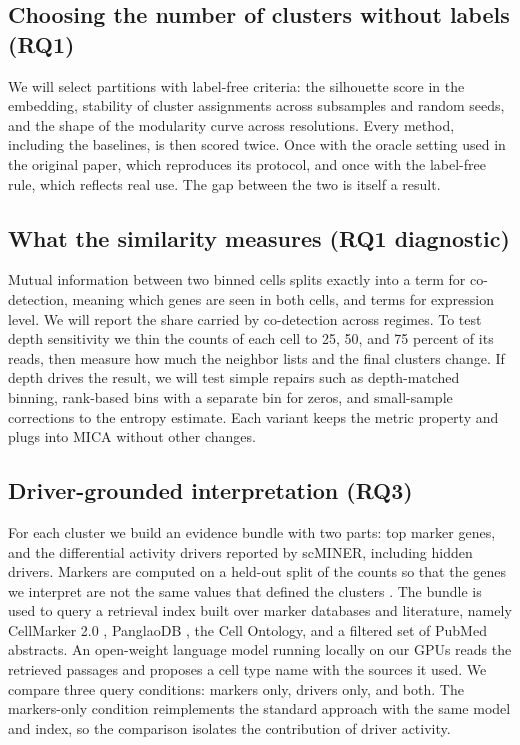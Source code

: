 \subsection{Choosing the number of clusters without labels (RQ1)}
We will select partitions with label-free criteria: the silhouette score in the embedding, stability of cluster assignments across subsamples and random seeds, and the shape of the modularity curve across resolutions. Every method, including the baselines, is then scored twice. Once with the oracle setting used in the original paper, which reproduces its protocol, and once with the label-free rule, which reflects real use. The gap between the two is itself a result.

\subsection{What the similarity measures (RQ1 diagnostic)}
Mutual information between two binned cells splits exactly into a term for co-detection, meaning which genes are seen in both cells, and terms for expression level. We will report the share carried by co-detection across regimes. To test depth sensitivity we thin the counts of each cell to 25, 50, and 75 percent of its reads, then measure how much the neighbor lists and the final clusters change. If depth drives the result, we will test simple repairs such as depth-matched binning, rank-based bins with a separate bin for zeros, and small-sample corrections to the entropy estimate. Each variant keeps the metric property and plugs into MICA without other changes.

\subsection{Driver-grounded interpretation (RQ3)}
For each cluster we build an evidence bundle with two parts: top marker genes, and the differential activity drivers reported by scMINER, including hidden drivers. Markers are computed on a held-out split of the counts so that the genes we interpret are not the same values that defined the clusters \cite{neufeld2024inference}. The bundle is used to query a retrieval index built over marker databases and literature, namely CellMarker 2.0 \cite{hu2023cellmarker}, PanglaoDB \cite{franzen2019panglaodb}, the Cell Ontology, and a filtered set of PubMed abstracts. An open-weight language model running locally on our GPUs reads the retrieved passages and proposes a cell type name with the sources it used. We compare three query conditions: markers only, drivers only, and both. The markers-only condition reimplements the standard approach \cite{hou2024gpt4} with the same model and index, so the comparison isolates the contribution of driver activity.

